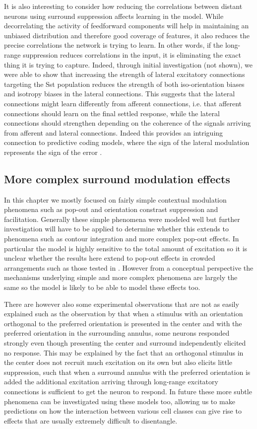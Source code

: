It is also interesting to consider how reducing the
correlations between distant neurons using surround suppression
affects learning in the model. While decorrelating the activity of
feedforward components will help in maintaining an unbiased
distribution and therefore good coverage of features, it also reduces
the precise correlations the network is trying to learn. In other words, if the
long-range suppression reduces correlations in the input, it is
eliminating the exact thing it is trying to capture. Indeed, through
initial investigation (not shown), we were able to show that
increasing the strength of lateral excitatory connections targeting
the Sst population reduces the strength of both iso-orientation biases
and isotropy biases in the lateral connections. This suggests that the
lateral connections might learn differently from afferent connections,
i.e. that afferent connections should learn on the final settled
response, while the lateral connections should strengthen depending on
the coherence of the signals arriving from afferent and lateral
connections. Indeed this provides an intriguing connection to
predictive coding models, where the sign of the lateral modulation
represents the sign of the error \citep{Rao1999}.

\subsection{More complex surround modulation effects}

In this chapter we mostly focused on fairly simple contextual
modulation phenomena such as pop-out and orientation constrast
suppression and facilitation. Generally these simple phenomena were
modeled well but further investigation will have to be applied to
determine whether this extends to phenomena such as contour
integration and more complex pop-out effects. In particular the model
is highly sensitive to the total amount of excitation so it is unclear
whether the results here extend to pop-out effects in crowded
arrangements such as those tested in \citep{Li2002}. However from a
conceptual perspective the mechanisms underlying simple and more
complex phenomena are largely the same so the model is likely to be
able to model these effects too.

There are however also some experimental observations that are not as
easily explained such as the observation by \cite{Sillito1995} that
when a stimulus with an orientation orthogonal to the preferred
orientation is presented in the center and with the preferred
orientation in the surrounding annulus, some neurons responded
strongly even though presenting the center and surround independently
elicited no response. This may be explained by the fact that an
orthogonal stimulus in the center does not recruit much excitation on
its own but also elicits little suppression, such that when a surround
annulus with the preferred orientation is added the additional
excitation arriving through long-range excitatory connections is
sufficient to get the neuron to respond. In future these more subtle
phenomena can be investigated using these models too, allowing us to
make predictions on how the interaction between various cell classes
can give rise to effects that are usually extremely difficult to
disentangle.

